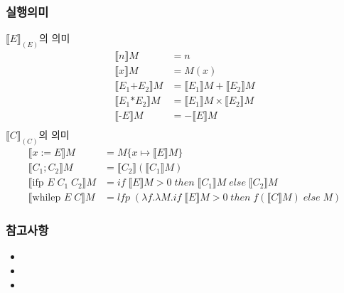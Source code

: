 \documentclass{simplesnt}
\begin{document}
\begin{frame}
  \frametitle{실행의미}
  $\llbracket E \rrbracket_{(E)}$의 의미
  \begin{align*}
      \llbracket n \rrbracket M &= n \\
      \llbracket x \rrbracket M &= M(x) \\
      \llbracket E_1 \text{+} E_2 \rrbracket M &= \llbracket E_1 \rrbracket M + \llbracket E_2 \rrbracket M \\
      \llbracket E_1 \text{*} E_2 \rrbracket M &= \llbracket E_1 \rrbracket M \times \llbracket E_2 \rrbracket M \\
      \llbracket \text{-} E \rrbracket M &= - \llbracket E \rrbracket M\\
  \end{align*}
  $\llbracket C \rrbracket_{(C)}$의 의미
  \begin{align*}
      \llbracket x := E \rrbracket M &= M\{x \mapsto \llbracket E \rrbracket M\} \\
      \llbracket C_1 ; C_2 \rrbracket M &= \llbracket C_2 \rrbracket (\llbracket C_1 \rrbracket M)  \\
      \llbracket \text{ifp } E \; C_1 \; C_2 \rrbracket M &= if \; \llbracket E \rrbracket M > 0 \; then \; \llbracket C_1 \rrbracket M \; else \; \llbracket C_2 \rrbracket M \\
      \llbracket \text{whilep } E \; C \rrbracket M &= lfp \; (\lambda f. \lambda M. if \; \llbracket E \rrbracket M > 0 \; then \; f(\llbracket C \rrbracket M) \; else \; M)
  \end{align*}
\end{frame}

\begin{frame}
  \frametitle{참고사항}
  \begin{itemize}
    \item {}
    \vspace{0.3cm}
    \item {}
    \vspace{0.3cm}
    \item {}
  \end{itemize}
\end{frame}
\end{document}
